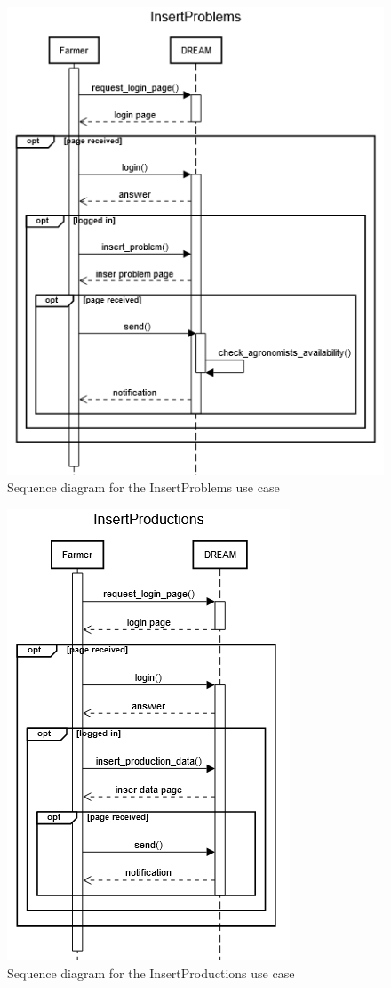 \documentclass{article}
\begin{document}
\begin{figure}[h]
    \centering
    \includegraphics[scale=0.75]{sequence_diagrams/InsertProblems}
    \caption{Sequence diagram for the InsertProblems use case}
\end{figure}

\begin{figure}[h]
    \centering
    \includegraphics[scale=0.75]{sequence_diagrams/InsertProductions}
    \caption{Sequence diagram for the InsertProductions use case}
\end{figure}
\end{document}
